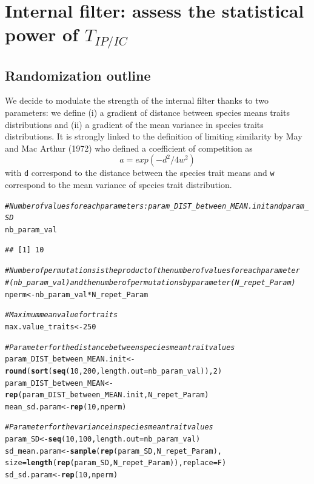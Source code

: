 \documentclass[12pt]{article}\usepackage[]{graphicx}\usepackage[]{color}
\makeatletter
\newcommand{\hlnum}[1]{\textcolor[rgb]{0.686,0.059,0.569}{#1}}%
\newcommand{\hlcom}[1]{\textcolor[rgb]{0.678,0.584,0.686}{\textit{#1}}}%
\newcommand{\hlopt}[1]{\textcolor[rgb]{0,0,0}{#1}}%
\newcommand{\hlstd}[1]{\textcolor[rgb]{0.345,0.345,0.345}{#1}}%
\newcommand{\hlkwb}[1]{\textcolor[rgb]{0.69,0.353,0.396}{#1}}%
\newcommand{\hlkwc}[1]{\textcolor[rgb]{0.333,0.667,0.333}{#1}}%
\newcommand{\hlkwd}[1]{\textcolor[rgb]{0.737,0.353,0.396}{\textbf{#1}}}%
\newenvironment{kframe}{%
 \def\at@end@of@kframe{}%
 \ifinner\ifhmode%
  \def\at@end@of@kframe{\end{minipage}}%
  \begin{minipage}{\columnwidth}%
 \fi\fi%
 \def\FrameCommand##1{\hskip\@totalleftmargin \hskip-\fboxsep
 \colorbox{shadecolor}{##1}\hskip-\fboxsep
     \hskip-\linewidth \hskip-\@totalleftmargin \hskip\columnwidth}%
 \MakeFramed {\advance\hsize-\width
   \@totalleftmargin\z@ \linewidth\hsize
   \@setminipage}}%
 {\par\unskip\endMakeFramed%
 \at@end@of@kframe}
\newenvironment{knitrout}{}{} %
\makeatother
\begin{document}
\cleardoublepage

\section{Internal filter: assess the statistical power of $T_{IP/IC}$}
  \subsection {Randomization outline}
 
We decide to modulate the strength of the internal filter thanks to two parameters:
we define (i) a gradient of distance between species means traits distributions and (ii) a gradient of the mean variance in species traits distributions. It is strongly linked to the definition of limiting similarity by May and Mac Arthur (1972) who defined a coefficient of competition as $$a = exp (-d^2/4w^2)$$ with \texttt{d} correspond to the distance between the species trait means and \texttt{w} correspond to the mean variance of species trait distribution. 

\begin{knitrout}\small
{}\color{fgcolor}\begin{kframe}
\begin{alltt}
\hlcom{# Number of values for each parameters: param_DIST_between_MEAN.init and param_SD}
\hlstd{nb_param_val}
\end{alltt}
\begin{verbatim}
## [1] 10
\end{verbatim}
\begin{alltt}
\hlcom{# Number of permutations is the product of the number of values for each parameter}
\hlcom{#(nb_param_val) and the number of permutations by parameter (N_repet_Param)}
\hlstd{nperm} \hlkwb{<-} \hlstd{nb_param_val} \hlopt{*} \hlstd{N_repet_Param}

\hlcom{# Maximum mean value for traits}
\hlstd{max.value_traits} \hlkwb{<-} \hlnum{250}

\hlcom{# Parameter for the distance between species mean trait values}
\hlstd{param_DIST_between_MEAN.init} \hlkwb{<-} \hlkwd{round}\hlstd{(}\hlkwd{sort}\hlstd{(}\hlkwd{seq}\hlstd{(}\hlnum{10}\hlstd{,} \hlnum{200}\hlstd{,} \hlkwc{length.out} \hlstd{= nb_param_val)),} \hlnum{2}\hlstd{)}
\hlstd{param_DIST_between_MEAN} \hlkwb{<-} \hlkwd{rep}\hlstd{(param_DIST_between_MEAN.init, N_repet_Param)}
\hlstd{mean_sd.param} \hlkwb{<-} \hlkwd{rep}\hlstd{(}\hlnum{10}\hlstd{, nperm)}

\hlcom{# Parameter for the variance in species mean trait values}
\hlstd{param_SD} \hlkwb{<-} \hlkwd{seq}\hlstd{(}\hlnum{10}\hlstd{,} \hlnum{100}\hlstd{,}\hlkwc{length.out} \hlstd{= nb_param_val)}
\hlstd{sd_mean.param} \hlkwb{<-} \hlkwd{sample} \hlstd{(}\hlkwd{rep}\hlstd{(param_SD, N_repet_Param),}
       \hlkwc{size} \hlstd{=} \hlkwd{length}\hlstd{(}\hlkwd{rep}\hlstd{(param_SD, N_repet_Param)),} \hlkwc{replace} \hlstd{= F)}
\hlstd{sd_sd.param} \hlkwb{<-} \hlkwd{rep}\hlstd{(}\hlnum{10}\hlstd{, nperm)}
\end{alltt}
\end{kframe}
\end{knitrout}
\end{document}
